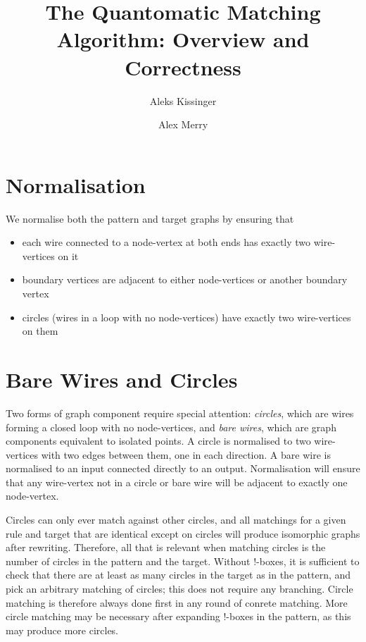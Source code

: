 \documentclass{article}
\title{The Quantomatic Matching Algorithm: Overview and Correctness}
\author{Aleks Kissinger \and Alex Merry}
\begin{document}
\maketitle

\section{Normalisation}
\label{sec:normalisation}

We normalise both the pattern and target graphs by ensuring that
\begin{itemize}
\item each wire connected to a node-vertex at both ends has exactly two wire-vertices on it
\item boundary vertices are adjacent to either node-vertices or another boundary vertex
\item circles (wires in a loop with no node-vertices) have exactly two wire-vertices on them
\end{itemize}

\section{Bare Wires and Circles}
\label{sec:wires-and-circles}

Two forms of graph component require special attention: \emph{circles}, which are wires forming a closed loop with no node-vertices, and \emph{bare wires}, which are graph components equivalent to isolated points.  A circle is normalised to two wire-vertices with two edges between them, one in each direction.  A bare wire is normalised to an input connected directly to an output.  Normalisation will ensure that any wire-vertex not in a circle or bare wire will be adjacent to exactly one node-vertex.

Circles can only ever match against other circles, and all matchings for a given rule and target that are identical except on circles will produce isomorphic graphs after rewriting.  Therefore, all that is relevant when matching circles is the number of circles in the pattern and the target.  Without $!$-boxes, it is sufficient to check that there are at least as many circles in the target as in the pattern, and pick an arbitrary matching of circles; this does not require any branching.  Circle matching is therefore always done first in any round of conrete matching.  More circle matching may be necessary after expanding $!$-boxes in the pattern, as this may produce more circles.
\end{document}
